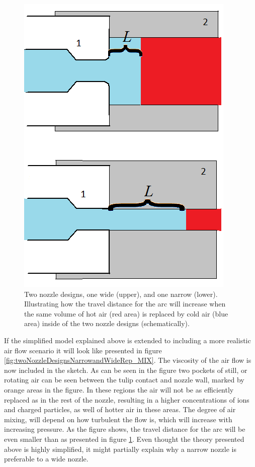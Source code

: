 \documentclass[10pt,b5paper,twoside]{article}
\begin{document}
\begin{figure}[H]
\centering
\includegraphics[scale=0.45]{Bilder/Results/nozzle_cooling_1.png}
\caption{Two nozzle designs, one wide (upper), and one narrow (lower). Illustrating how the travel distance for the arc will increase when the same volume of hot air (red area) is replaced by cold air (blue area) inside of the two nozzle designs (schematically).} \label{fig:twoNozzleDesignsNarrowandWideRep}
\end{figure}

If the simplified model explained above is extended to including a more realistic air flow scenario it will look like presented in figure \ref{fig:twoNozzleDesignsNarrowandWideRep_MIX}. The viscosity of the air flow is now included in the sketch. As can be seen in the figure two pockets of still, or rotating air can be seen between the tulip contact and nozzle wall, marked by orange areas in the figure. In these regions the air will not be as efficiently replaced as in the rest of the nozzle, resulting in a higher concentrations of ions and charged particles, as well of hotter air in these areas. The degree of air mixing, will depend on how turbulent the flow is, which will increase with increasing pressure. As the figure shows, the travel distance for the arc will be even smaller than as presented in figure \ref{fig:twoNozzleDesignsNarrowandWideRep}. Even thought the theory presented above is highly simplified, it might partially explain why a narrow nozzle is preferable to a wide nozzle. 
 
\end{document}

